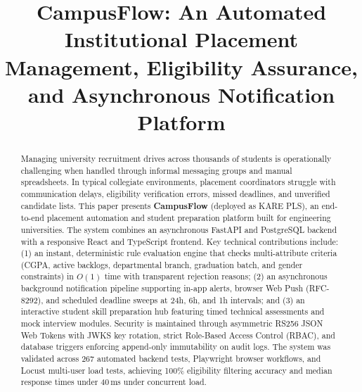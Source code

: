 \documentclass[conference]{IEEEtran}
\begin{document}
\title{CampusFlow: An Automated Institutional Placement Management, Eligibility Assurance, and Asynchronous Notification Platform}

\author{
\and
{}
\and
{}
}

\maketitle

\begin{abstract}
Managing university recruitment drives across thousands of students is operationally challenging when handled through informal messaging groups and manual spreadsheets. In typical collegiate environments, placement coordinators struggle with communication delays, eligibility verification errors, missed deadlines, and unverified candidate lists. This paper presents \textbf{CampusFlow} (deployed as KARE PLS), an end-to-end placement automation and student preparation platform built for engineering universities. The system combines an asynchronous FastAPI and PostgreSQL backend with a responsive React and TypeScript frontend. Key technical contributions include: (1) an instant, deterministic rule evaluation engine that checks multi-attribute criteria (CGPA, active backlogs, departmental branch, graduation batch, and gender constraints) in $O(1)$ time with transparent rejection reasons; (2) an asynchronous background notification pipeline supporting in-app alerts, browser Web Push (RFC-8292), and scheduled deadline sweeps at 24h, 6h, and 1h intervals; and (3) an interactive student skill preparation hub featuring timed technical assessments and mock interview modules. Security is maintained through asymmetric RS256 JSON Web Tokens with JWKS key rotation, strict Role-Based Access Control (RBAC), and database triggers enforcing append-only immutability on audit logs. The system was validated across 267 automated backend tests, Playwright browser workflows, and Locust multi-user load tests, achieving 100\% eligibility filtering accuracy and median response times under 40\,ms under concurrent load.
\end{abstract}
\end{document}
